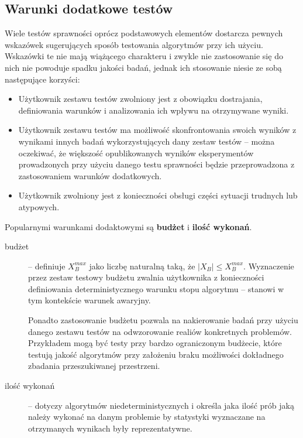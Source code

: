 \documentclass[12pt,a4paper]{report}
\begin{document}
{{{{{{\subsection{Warunki dodatkowe testów}
\par
{
Wiele testów sprawności oprócz podstawowych elementów dostarcza pewnych wskazówek sugerujących sposób testowania algorytmów przy ich użyciu. Wskazówki te nie mają wiążącego charakteru i zwykle nie zastosowanie się do nich nie powoduje spadku jakości badań, jednak ich stosowanie niesie ze sobą następujące korzyści:
\begin{itemize}
\item Użytkownik zestawu testów zwolniony jest z obowiązku dostrajania, definiowania warunków i analizowania ich wpływu na otrzymywane wyniki.
\item Użytkownik zestawu testów ma możliwość skonfrontowania swoich wyników z wynikami innych badań wykorzystujących dany zestaw testów -- można oczekiwać, że większość opublikowanych wyników eksperymentów prowadzonych przy użyciu danego testu sprawności będzie przeprowadzona z zastosowaniem warunków dodatkowych.
\item Użytkownik zwolniony jest z konieczności obsługi części sytuacji trudnych lub atypowych.
\end{itemize}
}
\par{
Popularnymi warunkami dodaktowymi są \textbf{budżet} i \textbf{ilość wykonań}.
\begin{description}
\item[budżet] -- definiuje $X_{B}^{max}$ jako liczbę naturalną taką, że $|X_B| \le X_{B}^{max}$. Wyznaczenie przez zestaw testowy budżetu zwalnia użytkownika z konieczności definiowania deterministycznego warunku stopu algorytmu -- stanowi w tym kontekście warunek awaryjny.

Ponadto zastosowanie budżetu pozwala na nakierowanie badań przy użyciu danego zestawu testów na odwzorowanie realiów konkretnych problemów. Przykładem mogą być testy przy bardzo ograniczonym budżecie, które testują jakość algorytmów przy założeniu braku możliwości dokładnego zbadania przeszukiwanej przestrzeni.
\item[ilość wykonań] -- dotyczy algorytmów niedeterministycznych i określa jaka ilość prób jaką należy wykonać na danym problemie by statystyki wyznaczane na otrzymanych wynikach były reprezentatywne.
\end{description}
}

}}}}}}
\end{document}
